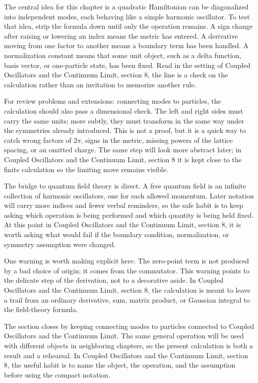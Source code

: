 The central idea for this chapter is a quadratic Hamiltonian can be diagonalized into independent modes, each behaving like a simple harmonic oscillator.  To test that idea, strip the formula down until only the operation remains.  A sign change after raising or lowering an index means the metric has entered.  A derivative moving from one factor to another means a boundary term has been handled.  A normalization constant means that some unit object, such as a delta function, basis vector, or one-particle state, has been fixed.  Read in the setting of Coupled Oscillators and the Continuum Limit, section 8, the line is a check on the calculation rather than an invitation to memorize another rule.

For review problems and extensions: connecting modes to particles, the calculation should also pass a dimensional check.  The left and right sides must carry the same units; more subtly, they must transform in the same way under the symmetries already introduced.  This is not a proof, but it is a quick way to catch wrong factors of \(2\pi\), signs in the metric, missing powers of the lattice spacing, or an omitted charge.  The same step will look more abstract later; in Coupled Oscillators and the Continuum Limit, section 8 it is kept close to the finite calculation so the limiting move remains visible.

The bridge to quantum field theory is direct.  A free quantum field is an infinite collection of harmonic oscillators, one for each allowed momentum.  Later notation will carry more indices and fewer verbal reminders, so the safe habit is to keep asking which operation is being performed and which quantity is being held fixed.  At this point in Coupled Oscillators and the Continuum Limit, section 8, it is worth asking what would fail if the boundary condition, normalization, or symmetry assumption were changed.

One warning is worth making explicit here.  The zero-point term is not produced by a bad choice of origin; it comes from the commutator.  This warning points to the delicate step of the derivation, not to a decorative aside.  In Coupled Oscillators and the Continuum Limit, section 8, the calculation is meant to leave a trail from an ordinary derivative, sum, matrix product, or Gaussian integral to the field-theory formula.

The section closes by keeping connecting modes to particles connected to Coupled Oscillators and the Continuum Limit.  The same general operation will be used with different objects in neighboring chapters, so the present calculation is both a result and a rehearsal.  In Coupled Oscillators and the Continuum Limit, section 8, the useful habit is to name the object, the operation, and the assumption before using the compact notation.




